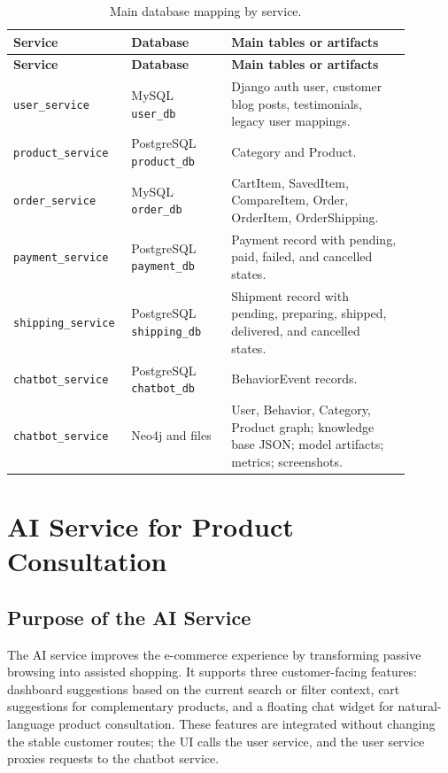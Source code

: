 \documentclass[12pt,a4paper]{article}
\begin{document}
\begin{longtable}{p{0.22\linewidth}p{0.24\linewidth}p{0.43\linewidth}}
\caption{Main database mapping by service.}
\label{tab:database-mapping}\\
\toprule
\textbf{Service} & \textbf{Database} & \textbf{Main tables or artifacts}\\
\midrule
\endfirsthead
\toprule
\textbf{Service} & \textbf{Database} & \textbf{Main tables or artifacts}\\
\midrule
\endhead
\texttt{user\_service} & MySQL \texttt{user\_db} & Django auth user, customer blog posts, testimonials, legacy user mappings.\\
\texttt{product\_service} & PostgreSQL \texttt{product\_db} & Category and Product.\\
\texttt{order\_service} & MySQL \texttt{order\_db} & CartItem, SavedItem, CompareItem, Order, OrderItem, OrderShipping.\\
\texttt{payment\_service} & PostgreSQL \texttt{payment\_db} & Payment record with pending, paid, failed, and cancelled states.\\
\texttt{shipping\_service} & PostgreSQL \texttt{shipping\_db} & Shipment record with pending, preparing, shipped, delivered, and cancelled states.\\
\texttt{chatbot\_service} & PostgreSQL \texttt{chatbot\_db} & BehaviorEvent records.\\
\texttt{chatbot\_service} & Neo4j and files & User, Behavior, Category, Product graph; knowledge base JSON; model artifacts; metrics; screenshots.\\
\bottomrule
\end{longtable}

\section{AI Service for Product Consultation}

\subsection{Purpose of the AI Service}

The AI service improves the e-commerce experience by transforming passive browsing into assisted shopping. It supports three customer-facing features: dashboard suggestions based on the current search or filter context, cart suggestions for complementary products, and a floating chat widget for natural-language product consultation. These features are integrated without changing the stable customer routes; the UI calls the user service, and the user service proxies requests to the chatbot service.
\end{document}
